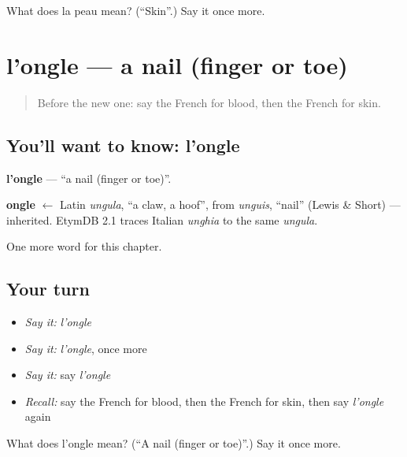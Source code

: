 \begin{tcolorbox}[breakable,colback=teal!4,colframe=teal!35!black,title={Before you move on}]
What does la peau mean? (\textquotedblleft{}Skin\textquotedblright{}.) Say it once more.
\end{tcolorbox}
\section[l'ongle]{l'ongle — a nail (finger or toe)}

\label{lesson:FR-C51-ongle}



\begin{quote}
Before the new one: say the French for blood, then the French for skin.
\end{quote}

\subsection*{You'll want to know: l'ongle}
\textbf{l'ongle} — \textquotedblleft{}a nail (finger or toe)\textquotedblright{}.

\begin{cousinweb}
\textbf{ongle} $\leftarrow$ Latin \emph{ungula}, \textquotedblleft{}a claw, a hoof\textquotedblright{}, from \emph{unguis}, \textquotedblleft{}nail\textquotedblright{} (Lewis \& Short) — inherited. EtymDB 2.1 traces Italian \emph{unghia} to the same \emph{ungula}.
\end{cousinweb}

\begin{grammarlens}[title={What you've built}]
One more word for this chapter.
\end{grammarlens}

\subsection*{Your turn}
\begin{itemize}
\raggedright
  \item \emph{Say it:} \emph{l'ongle}
  \item \emph{Say it:} \emph{l'ongle}, once more
  \item \emph{Say it:} say \emph{l'ongle}
  \item \emph{Recall:} say the French for blood, then the French for skin, then say \emph{l'ongle} again
\end{itemize}

\begin{tcolorbox}[breakable,colback=teal!4,colframe=teal!35!black,title={Before you move on}]
What does l'ongle mean? (\textquotedblleft{}A nail (finger or toe)\textquotedblright{}.) Say it once more.
\end{tcolorbox}
